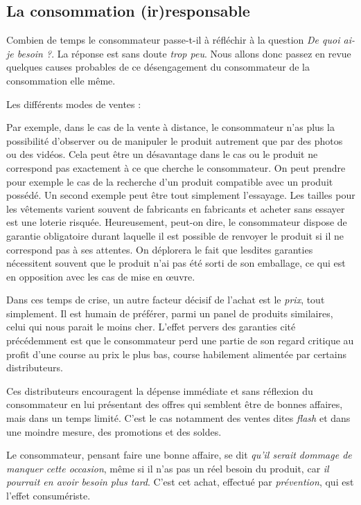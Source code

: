 \subsection{La consommation (ir)responsable}

Combien de temps le consommateur passe-t-il à réfléchir à la question \textit{De quoi ai-je besoin ?}.
La réponse est sans doute \textit{trop peu}. Nous allons donc passez en revue quelques causes probables de ce désengagement du consommateur de la consommation elle même.

\medbreak
Les différents modes de ventes  : 

Par exemple, dans le cas de la vente à distance, le consommateur n'as plus la possibilité d'observer ou de manipuler le produit autrement que par des photos ou des vidéos.
Cela peut être un désavantage dans le cas ou le produit ne correspond pas exactement à ce que cherche le consommateur.
\medbreak
On peut prendre pour exemple le cas de la recherche d'un produit compatible avec un produit possédé.
Un second exemple peut être tout simplement l'essayage. Les tailles pour les vêtements varient souvent de fabricants en fabricants et acheter sans essayer est une loterie risquée.
\smallbreak
Heureusement, peut-on dire, le consommateur dispose de garantie obligatoire durant laquelle il est possible de renvoyer le produit si il ne correspond pas à ses attentes. On déplorera le fait que lesdites garanties nécessitent souvent que le produit n'ai pas été sorti de son emballage, ce qui est en opposition avec les cas de mise en œuvre.

\medbreak
Dans ces temps de crise, un autre facteur décisif de l'achat est le \textit{prix}, tout simplement.
Il est humain de préférer, parmi un panel de produits similaires, celui qui nous parait le moins cher.
L'effet pervers des garanties cité précédemment est que le consommateur perd une partie de son regard critique au profit d'une course au prix le plus bas, course habilement alimentée par certains distributeurs.

\smallbreak
Ces distributeurs encouragent la dépense immédiate et sans réflexion du consommateur en lui présentant des offres qui semblent être de bonnes affaires, mais dans un temps limité. C'est le cas notamment des ventes dites \textit{flash} et dans une moindre mesure, des promotions et des soldes.

\smallbreak
Le consommateur, pensant faire une bonne affaire, se dit \textit{qu'il serait dommage de manquer cette occasion}, même si il n'as pas un réel besoin du produit, car \textit{il pourrait en avoir besoin plus tard}. C'est cet achat, effectué par \textit{prévention}, qui est l'effet consumériste.

